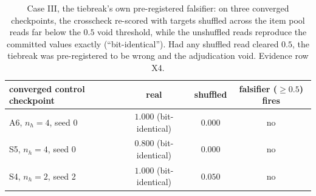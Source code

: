 \documentclass{article}
\begin{document}
\begin{table}[H]
\centering
\footnotesize
\begin{tabular}{@{}lccc@{}}
\toprule
converged control checkpoint & real & shuffled & falsifier ($\geq0.5$) fires \\
\midrule
A6, $n_h{=}4$, seed 0 & $1.000$ (bit-identical) & $0.000$ & no \\
S5, $n_h{=}4$, seed 0 & $0.800$ (bit-identical) & $0.000$ & no \\
S4, $n_h{=}2$, seed 2 & $1.000$ (bit-identical) & $0.050$ & no \\
\bottomrule
\end{tabular}
\caption{Case III, the tiebreak's own pre-registered falsifier: on
three converged checkpoints, the crosscheck re-scored with targets
shuffled across the item pool reads far below the $0.5$ void
threshold, while the unshuffled reads reproduce the committed values
exactly (``bit-identical''). Had any shuffled read cleared $0.5$, the
tiebreak was pre-registered to be wrong and the adjudication void.
Evidence row X4.}
\label{tab:teeth}
\end{table}
\end{document}
